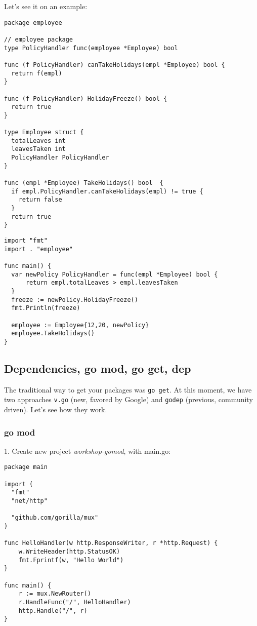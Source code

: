 \documentclass[11pt, letterpaper]{article}
\begin{document}
Let's see it on an example:

\begin{verbatim}
package employee

// employee package
type PolicyHandler func(employee *Employee) bool

func (f PolicyHandler) canTakeHolidays(empl *Employee) bool {
  return f(empl)
}

func (f PolicyHandler) HolidayFreeze() bool {
  return true
}

type Employee struct {
  totalLeaves int
  leavesTaken int
  PolicyHandler PolicyHandler
}

func (empl *Employee) TakeHolidays() bool  {
  if empl.PolicyHandler.canTakeHolidays(empl) != true {
    return false
  }
  return true
}
\end{verbatim}

\begin{verbatim}
import "fmt"
import . "employee"

func main() {
  var newPolicy PolicyHandler = func(empl *Employee) bool {
      return empl.totalLeaves > empl.leavesTaken
  }
  freeze := newPolicy.HolidayFreeze()
  fmt.Println(freeze)

  employee := Employee{12,20, newPolicy}
  employee.TakeHolidays()
}
\end{verbatim}


\subsection{Dependencies, go mod, go get, dep}

The traditional way to get your packages was \verb|go get|. At this moment, we have two approaches \verb|v.go| (new, favored by Google) and \verb|godep| (previous, community driven). Let's see how they work.

\subsubsection{go mod}
1. Create new project \emph{workshop-gomod}, with main.go:

\begin{verbatim}
package main

import (
  "fmt"
  "net/http"

  "github.com/gorilla/mux"
)

func HelloHandler(w http.ResponseWriter, r *http.Request) {
    w.WriteHeader(http.StatusOK)
    fmt.Fprintf(w, "Hello World")
}

func main() {
    r := mux.NewRouter()
    r.HandleFunc("/", HelloHandler)
    http.Handle("/", r)
}
\end{verbatim}
\end{document}
